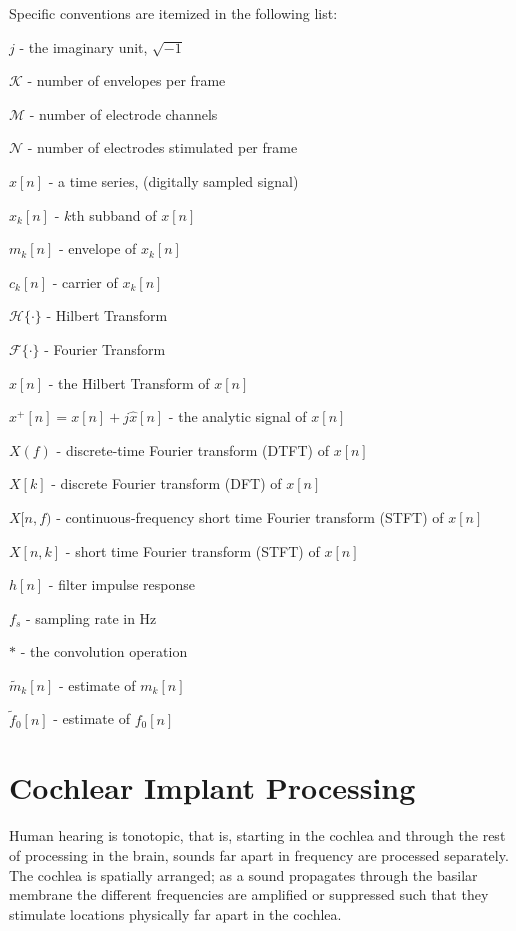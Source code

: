 \documentclass [11pt, proquest,oneside] {ganter_thesis}[2015/03/03]
\begin{document}
Specific conventions are itemized in the following list:

$j$ - the imaginary unit, $\sqrt{-1}$

$\mathcal{K}$ - number of envelopes per frame

$\mathcal{M}$ - number of electrode channels

$\mathcal{N}$ - number of electrodes stimulated per frame

$x[n]$ - a time series, (digitally sampled signal)

$x_k[n]$ - $k$th subband of $x[n]$

$m_k[n]$ - envelope of $x_k[n]$

$c_k[n]$ - carrier of $x_k[n]$

$\mathcal{H}\{\cdot\}$ - Hilbert Transform

$\mathcal{F}\{\cdot\}$ - Fourier Transform

$\widehat{x}[n]$ - the Hilbert Transform of $x[n]$

$x^+[n] = x[n] + j\widehat{x}[n]$ - the analytic signal of $x[n]$

$X(f)$ - discrete-time Fourier transform (DTFT) of $x[n]$

$X[k]$ - discrete Fourier transform (DFT) of $x[n]$

$X[n,f)$ - continuous-frequency short time Fourier transform (STFT) of $x[n]$

$X[n,k]$ - short time Fourier transform (STFT) of $x[n]$

$h[n]$ - filter impulse response




$f_s$ - sampling rate in Hz

$*$ - the convolution operation

$\tilde{m}_k[n]$ - estimate of $m_k[n]$

$\tilde{f}_0[n]$ - estimate of $f_0[n]$



\chapter{Cochlear Implant Processing}\label{ch:ci_processing}

Human hearing is tonotopic, that is, starting in the cochlea and through the rest of processing in the brain, sounds far apart in frequency are processed separately.  The cochlea is spatially arranged; as a sound propagates through the basilar membrane the different frequencies are amplified or suppressed such that they stimulate locations physically far apart in the cochlea.
\end{document}
